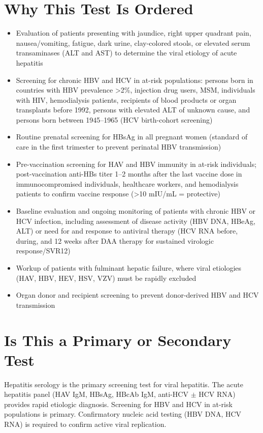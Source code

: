 \section*{Why This Test Is Ordered}
\begin{itemize}
  \item Evaluation of patients presenting with jaundice, right upper quadrant pain, nausea/vomiting, fatigue, dark urine, clay-colored stools, or elevated serum transaminases (ALT and AST) to determine the viral etiology of acute hepatitis
  \item Screening for chronic HBV and HCV in at-risk populations: persons born in countries with HBV prevalence >2\%, injection drug users, MSM, individuals with HIV, hemodialysis patients, recipients of blood products or organ transplants before 1992, persons with elevated ALT of unknown cause, and persons born between 1945--1965 (HCV birth-cohort screening)
  \item Routine prenatal screening for HBsAg in all pregnant women (standard of care in the first trimester to prevent perinatal HBV transmission)
  \item Pre-vaccination screening for HAV and HBV immunity in at-risk individuals; post-vaccination anti-HBs titer 1--2 months after the last vaccine dose in immunocompromised individuals, healthcare workers, and hemodialysis patients to confirm vaccine response (>10 mIU/mL = protective)
  \item Baseline evaluation and ongoing monitoring of patients with chronic HBV or HCV infection, including assessment of disease activity (HBV DNA, HBeAg, ALT) or need for and response to antiviral therapy (HCV RNA before, during, and 12 weeks after DAA therapy for sustained virologic response/SVR12)
  \item Workup of patients with fulminant hepatic failure, where viral etiologies (HAV, HBV, HEV, HSV, VZV) must be rapidly excluded
  \item Organ donor and recipient screening to prevent donor-derived HBV and HCV transmission
\end{itemize}

\section*{Is This a Primary or Secondary Test}
Hepatitis serology is the primary screening test for viral hepatitis. The acute hepatitis panel (HAV IgM, HBsAg, HBcAb IgM, anti-HCV $\pm$ HCV RNA) provides rapid etiologic diagnosis. Screening for HBV and HCV in at-risk populations is primary. Confirmatory nucleic acid testing (HBV DNA, HCV RNA) is required to confirm active viral replication.

